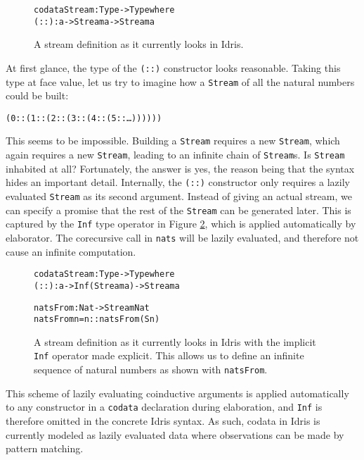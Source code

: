 \begin{figure}
\begin{alltt}
codata Stream : Type -> Type where
  (::) : a -> Stream a -> Stream a
\end{alltt}
\caption{A stream definition as it currently looks in Idris.}
\label{fig:stream_current}
\end{figure}

At first glance, the type of the \texttt{(::)} constructor looks reasonable. Taking this type at face value, let us try to imagine how a \texttt{Stream} of all the natural numbers could be built:

\begin{alltt}
(0 :: (1 :: (2 :: (3 :: (4 :: (5 :: \ldots))))))
\end{alltt}

This seems to be impossible. Building a \texttt{Stream} requires a new \texttt{Stream}, which again requires a new \texttt{Stream}, leading to an infinite chain of \texttt{Stream}s. Is \texttt{Stream} inhabited at all? Fortunately, the answer is yes, the reason being that the syntax hides an important detail. Internally, the \texttt{(::)} constructor only requires a lazily evaluated \texttt{Stream} as its second argument. Instead of giving an actual stream, we can specify a promise that the rest of the \texttt{Stream} can be generated later. This is captured by the \texttt{Inf} type operator in Figure \ref{fig:stream_current_Inf_and_natsFrom}, which is applied automatically by elaborator. The corecursive call in \texttt{nats} will be lazily evaluated, and therefore not cause an infinite computation.

\begin{figure}
\begin{alltt}
codata Stream : Type -> Type where
  (::) : a -> Inf (Stream a) -> Stream a

natsFrom : Nat -> Stream Nat
natsFrom n = n :: natsFrom (S n)
\end{alltt}
\caption{A stream definition as it currently looks in Idris with the implicit \texttt{Inf} operator made explicit. This allows us to define an infinite sequence of natural numbers as shown with \texttt{natsFrom}.}
\label{fig:stream_current_Inf_and_natsFrom}
\end{figure}

This scheme of lazily evaluating coinductive arguments is applied automatically to any constructor in a \texttt{codata} declaration during elaboration, and \texttt{Inf} is therefore omitted in the concrete Idris syntax. As such, codata in Idris is currently modeled as lazily evaluated data where observations can be made by pattern matching.

